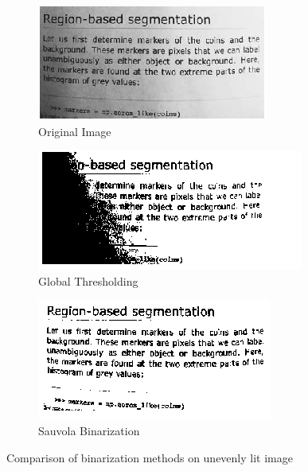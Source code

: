 \begin{figure}[H]
\hspace*{\fill} %
\begin{subfigure}{0.31\textwidth}
\includegraphics[width=\linewidth]{img/bin_orig.png}
\caption{Original Image} \label{fig:1a}
\end{subfigure}
\hspace*{\fill} %
\begin{subfigure}{0.31\textwidth}
\includegraphics[width=\linewidth]{img/bin_glob.png}
\caption{Global Thresholding} \label{fig:1b}
\end{subfigure}
\hspace*{\fill} %
\begin{subfigure}{0.31\textwidth}
\includegraphics[width=\linewidth]{img/bin_sauvola.png}
\caption{Sauvola Binarization}\label{fig:1c}
\end{subfigure}
\caption{Comparison of binarization methods on unevenly lit image} \label{fig:1}
\end{figure}

